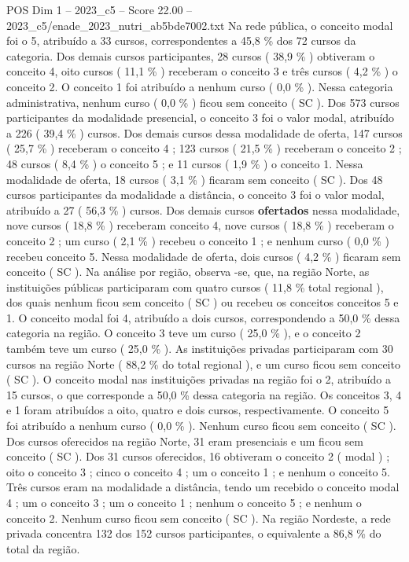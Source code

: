 \begin{textsample}{POS Dim 1 – 2023\_c5 – Score 22.00 – 2023\_c5/enade\_2023\_nutri\_ab5bde7002.txt}
Na rede pública, o conceito modal foi o 5, atribuído a 33 cursos, correspondentes a 45,8 \% dos 72 cursos da categoria.
Dos demais cursos participantes, 28 cursos ( 38,9 \% ) obtiveram o conceito 4, oito cursos ( 11,1 \% ) receberam o conceito 3 e três cursos ( 4,2 \% ) o conceito 2.
O conceito 1 foi atribuído a nenhum curso ( 0,0 \% ).
Nessa categoria administrativa, nenhum curso ( 0,0 \% ) ficou sem conceito ( SC ).
Dos 573 cursos participantes da modalidade presencial, o conceito 3 foi o valor modal, atribuído a 226 ( 39,4 \% ) cursos.
Dos demais cursos dessa modalidade de oferta, 147 cursos ( 25,7 \% ) receberam o conceito 4 ; 123 cursos ( 21,5 \% ) receberam o conceito 2 ; 48 cursos ( 8,4 \% ) o conceito 5 ; e 11 cursos ( 1,9 \% ) o conceito 1.
Nessa modalidade de oferta, 18 cursos ( 3,1 \% ) ficaram sem conceito ( SC ).
Dos 48 cursos participantes da modalidade a distância, o conceito 3 foi o valor modal, atribuído a 27 ( 56,3 \% ) cursos.
Dos demais cursos \textbf{ofertados} nessa modalidade, nove cursos ( 18,8 \% ) receberam conceito 4, nove cursos ( 18,8 \% ) receberam o conceito 2 ; um curso ( 2,1 \% ) recebeu o conceito 1 ; e nenhum curso ( 0,0 \% ) recebeu conceito 5.
Nessa modalidade de oferta, dois cursos ( 4,2 \% ) ficaram sem conceito ( SC ).
Na análise por região, observa -se, que, na região Norte, as instituições públicas participaram com quatro cursos ( 11,8 \% total regional ), dos quais nenhum ficou sem conceito ( SC ) ou recebeu os conceitos conceitos 5 e 1.
O conceito modal foi 4, atribuído a dois cursos, correspondendo a 50,0 \% dessa categoria na região.
O conceito 3 teve um curso ( 25,0 \% ), e o conceito 2 também teve um curso ( 25,0 \% ).
As instituições privadas participaram com 30 cursos na região Norte ( 88,2 \% do total regional ), e um curso ficou sem conceito ( SC ).
O conceito modal nas instituições privadas na região foi o 2, atribuído a 15 cursos, o que corresponde a 50,0 \% dessa categoria na região.
Os conceitos 3, 4 e 1 foram atribuídos a oito, quatro e dois cursos, respectivamente.
O conceito 5 foi atribuído a nenhum curso ( 0,0 \% ).
Nenhum curso ficou sem conceito ( SC ).
Dos cursos oferecidos na região Norte, 31 eram presenciais e um ficou sem conceito ( SC ).
Dos 31 cursos oferecidos, 16 obtiveram o conceito 2 ( modal ) ; oito o conceito 3 ; cinco o conceito 4 ; um o conceito 1 ; e nenhum o conceito 5.
Três cursos eram na modalidade a distância, tendo um recebido o conceito modal 4 ; um o conceito 3 ; um o conceito 1 ; nenhum o conceito 5 ; e nenhum o conceito 2.
Nenhum curso ficou sem conceito ( SC ).
Na região Nordeste, a rede privada concentra 132 dos 152 cursos participantes, o equivalente a 86,8 \% do total da região.

\end{textsample}
